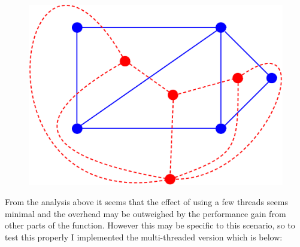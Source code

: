 \documentclass[../../../../../main.tex]{subfiles}
\begin{document}
\begin{landscape}
\begin{table}[ht]
\begin{tabular}
\\ \hline
\end{tabular}
\label{tbl:threadCreationTest}
\end{table}
\begin{figure}[H]
\includegraphics[height=0.25\textheight]{graphs/i.png}
\end{figure}
\end{landscape}
\noindent
From the analysis above it seems that the effect of using a few threads seems minimal and the overhead may be outweighed by the performance gain from other parts of the function. However this may be specific to this scenario, so to test this properly I implemented the multi-threaded version which is below:
\end{document}

